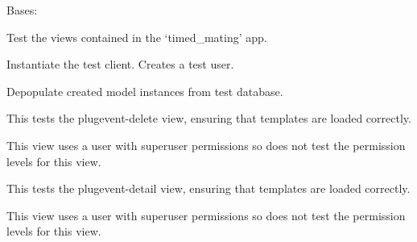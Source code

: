 \documentclass[letterpaper,10pt,english]{sphinxmanual}
\begin{document}
\begin{fulllineitems}
\label{api:timed_mating.tests.Timed_MatingViewTests}
Bases: 


Test the views contained in the `timed\_mating' app.


\begin{fulllineitems}
\label{api:timed_mating.tests.Timed_MatingViewTests.setUp}
Instantiate the test client.  Creates a test user.


\end{fulllineitems}


\begin{fulllineitems}
\label{api:timed_mating.tests.Timed_MatingViewTests.tearDown}
Depopulate created model instances from test database.


\end{fulllineitems}


\begin{fulllineitems}
\label{api:timed_mating.tests.Timed_MatingViewTests.test_plugevent_delete}
This tests the plugevent-delete view, ensuring that templates are loaded correctly.


This view uses a user with superuser permissions so does not test the permission levels for this view.


\end{fulllineitems}


\begin{fulllineitems}
\label{api:timed_mating.tests.Timed_MatingViewTests.test_plugevent_detail}
This tests the plugevent-detail view, ensuring that templates are loaded correctly.


This view uses a user with superuser permissions so does not test the permission levels for this view.



\end{fulllineitems}
\end{fulllineitems}
\end{document}
